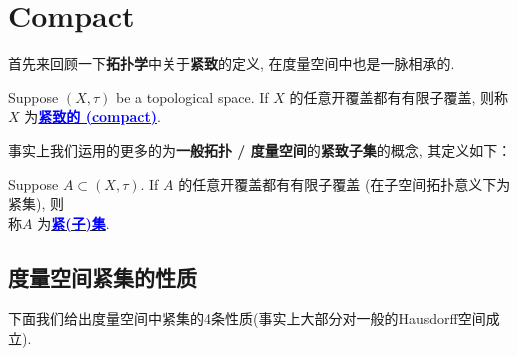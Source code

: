\newpage

\section{Compact}
	首先来回顾一下\textbf{拓扑学}中关于\textbf{紧致}的定义, 在度量空间中也是一脉相承的.
	\begin{defn}\label{def 1.6.1}
		Suppose $(X , \tau)$ be a topological space. If $X$ 的任意开覆盖都有有限子覆盖, 则称$X$ 为\underline{\textcolor{blue}{\textbf{紧致的 (compact)}}}.
		
		\vspace{2em}
		
		\begin{rmk}
			事实上我们运用的更多的为\textbf{一般拓扑 / 度量空间}的\textbf{紧致子集}的概念, 其定义如下：
			\begin{center}
				Suppose $A \subset (X , \tau)$. If $A$ 的任意开覆盖都有有限子覆盖 (在子空间拓扑意义下为紧集), 则\\
				称$A$ 为\underline{\textcolor{blue}{\textbf{紧(子)集}}}.
			\end{center}
		\end{rmk}
	\end{defn}

\vspace{2em}
\subsection{度量空间紧集的性质}	
	下面我们给出度量空间中紧集的4条性质(事实上大部分对一般的Hausdorff空间成立).
	
